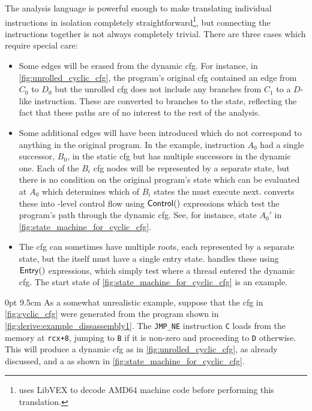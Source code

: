 The {\StateMachine} analysis language is powerful enough to make
translating individual instructions in isolation completely
straightforward\footnote{{\Implementation} uses LibVEX  to
  decode AMD64 machine code before performing this translation.}, but
connecting the instructions together is not always completely trivial.
There are three cases which require special care:
\begin{itemize}
\item
  Some edges will be erased from the dynamic \gls{cfg}.  For instance,
  in \autoref{fig:unrolled_cyclic_cfg}, the program's original
  \gls{cfg} contained an edge from $C_0$ to $D_0$ but the unrolled
  \gls{cfg} does not include any branches from $C_1$ to a $D$-like
  instruction.  These are converted to branches to the {\stUnreached}
  state, reflecting the fact that these paths are of no interest to
  the rest of the analysis.
\item
  Some additional edges will have been introduced which do not
  correspond to anything in the original program.  In the example,
  instruction $A_0$ had a single successor, $B_0$, in the static
  \gls{cfg} but has multiple successors in the dynamic one.  Each of
  the $B_i$ \gls{cfg} nodes will be represented by a separate
  {\StateMachine} state, but there is no condition on the original
  program's state which can be evaluated at $A_0$ which determines
  which of $B_i$ states the {\StateMachine} must execute next.
  {\Technique} converts these into {\StateMachine}-level control flow
  using ${\mathsf{Control}}()$ expressions which test the program's
  path through the dynamic \gls{cfg}.  See, for instance, state $A_0'$
  in \autoref{fig:state_machine_for_cyclic_cfg}.
\item
  The \gls{cfg} can sometimes have multiple roots, each represented by
  a separate {\StateMachine} state, but the {\StateMachine} itself
  must have a single entry state.  {\Technique} handles these using
  $\mathsf{Entry}()$ expressions, which simply test where a thread entered
  the dynamic \gls{cfg}.  The start state of
  \autoref{fig:state_machine_for_cyclic_cfg} is an example.
\end{itemize}

  0pt 9.5cm
\noindent As a somewhat unrealistic example, suppose that the
\gls{cfg} in \autoref{fig:cyclic_cfg} were generated from the program
shown in \autoref{fig:derive:example_dissassembly1}.  The
\texttt{JMP\_NE} instruction \texttt{C} loads from the memory at
\texttt{rcx+8}, jumping to \texttt{B} if it is non-zero and proceeding
to \texttt{D} otherwise.  This will produce a dynamic \gls{cfg} as in
\autoref{fig:unrolled_cyclic_cfg}, as already discussed, and a
\StateMachine{} as shown in
\autoref{fig:state_machine_for_cyclic_cfg}.

